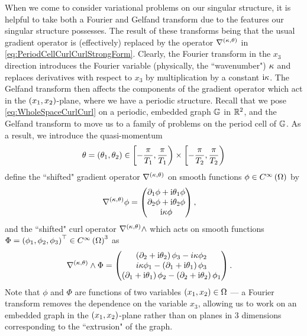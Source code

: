 When we come to consider variational problems on our singular structure, it is helpful to take both a Fourier and Gelfand transform due to the features our singular structure possesses.
The result of these transforms being that the usual gradient operator is (effectively) replaced by the operator $\nabla^{\left( \kappa, \theta \right)}$ in \eqref{eq:PeriodCellCurlCurlStrongForm}.
Clearly, the Fourier transform in the $x_3$ direction introduces the Fourier variable (physically, the ``wavenumber") $\kappa$ and replaces derivatives with respect to $x_3$ by multiplication by a constant $\mathrm{i}\kappa$.
The Gelfand transform then affects the components of the gradient operator which act in the $\left( x_1,x_2 \right)$-plane, where we have a periodic structure.
Recall that we pose \eqref{eq:WholeSpaceCurlCurl} on a periodic, embedded graph $\mathbb{G}$ in $\mathbb{R}^2$, and the Gelfand transform to move us to a family of problems on the period cell of $\mathbb{G}$.
As a result, we introduce the quasi-momentum
\begin{align*}
	\theta=\left( \theta_1,\theta_2 \right)\in\left[-\frac{\pi}{T_1},\frac{\pi}{T_1}\right)\times\left[-\frac{\pi}{T_2},\frac{\pi}{T_2}\right)
\end{align*}
define the ``shifted" gradient operator $\nabla^{\left( \kappa, \theta \right)}$ on smooth functions $\phi\in C^{\infty}\left( \Omega \right)$ by
\begin{align*}
	\nabla^{\left( \kappa, \theta \right)}\phi &= \begin{pmatrix} \partial_1\phi + \mathrm{i}\theta_1\phi \\ \partial_2\phi + \mathrm{i}\theta_2\phi \\ \mathrm{i}\kappa\phi \end{pmatrix},
\end{align*}
and the ``shifted" curl operator $\nabla_{}^{\left( \kappa, \theta \right)}\wedge$ which acts on smooth functions $\Phi=\left( \phi_1, \phi_2, \phi_3 \right)^{\top}\in C^{\infty}\left( \Omega \right)^3$ as
\begin{align*}
	\nabla_{}^{\left( \kappa, \theta \right)}\wedge\Phi &= \begin{pmatrix} \left( \partial_2 + \mathrm{i}\theta_2 \right)\phi_3 - i\kappa\phi_2 \\ i\kappa\phi_1 - \left( \partial_1 + \mathrm{i}\theta_1 \right)\phi_3 \\ \left( \partial_1 + \mathrm{i}\theta_1 \right)\phi_2 - \left( \partial_2 + \mathrm{i}\theta_2 \right)\phi_1 \end{pmatrix}.
\end{align*}
Note that $\phi$ and $\Phi$ are functions of two variables $\left( x_1,x_2 \right)\in\Omega$ --- a Fourier transform removes the dependence on the variable $x_3$, allowing us to work on an embedded graph in the $\left( x_1,x_2 \right)$-plane rather than on planes in 3 dimensions corresponding to the ``extrusion" of the graph.